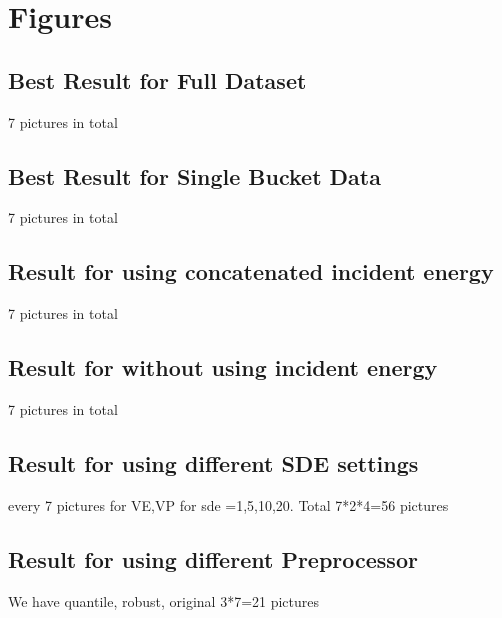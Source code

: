 
\chapter{Figures} %

\label{AppendixA} %

% 
%

\section{Best Result for Full Dataset}
7 pictures in total
\section{Best Result for Single Bucket Data}
7 pictures in total
\section{Result for using concatenated incident energy}
7 pictures in total
\section{Result for without using incident energy}
7 pictures in total
\section{Result for using different SDE settings}
every 7 pictures for VE,VP for sde =1,5,10,20. Total 7*2*4=56 pictures
\section{Result for using different Preprocessor}
We have quantile, robust, original
3*7=21 pictures